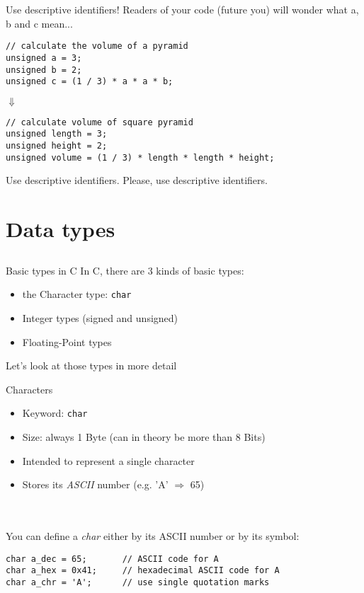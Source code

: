 \begin{frame}[fragile]{Use descriptive identifiers!}
    Readers of your code (future you) will wonder what a, b and c mean...
    \begin{lstlisting}
// calculate the volume of a pyramid
unsigned a = 3;
unsigned b = 2;
unsigned c = (1 / 3) * a * a * b;
\end{lstlisting}
    \centering$\Downarrow$\vspace*{5pt}
    \begin{lstlisting}
// calculate volume of square pyramid
unsigned length = 3;
unsigned height = 2;
unsigned volume = (1 / 3) * length * length * height;
\end{lstlisting}
\end{frame}

\begin{frame}{Use descriptive identifiers.}
    \LARGE
    \centering
    Please, use descriptive identifiers.\footnotemark
    
\end{frame}

\section{Data types}
\subsection{}

\begin{frame}[fragile]{Basic types in C}
    In C, there are 3 kinds of basic types:
    \begin{itemize}
        \item the Character type: \lstinline{char}
        \item Integer types (signed and unsigned)
        \item Floating-Point types
    \end{itemize}
    \bigskip
    Let's look at those types in more detail
\end{frame}

\begin{frame}[fragile]{Characters}
    \begin{itemize}
        \item Keyword: \lstinline{char}
        \item Size: always 1 Byte (can in theory be more than 8 Bits)
        \item Intended to represent a single character
        \item Stores its \textit{ASCII} number (e.g. 'A' $\Rightarrow$ 65)
    \end{itemize}\ \\
    \ \\
    You can define a \textit{char} either by its ASCII number or by its symbol:
    \begin{lstlisting}[numbers=none]
char a_dec = 65;       // ASCII code for A
char a_hex = 0x41;     // hexadecimal ASCII code for A
char a_chr = 'A';	   // use single quotation marks
\end{lstlisting}
\end{frame}

